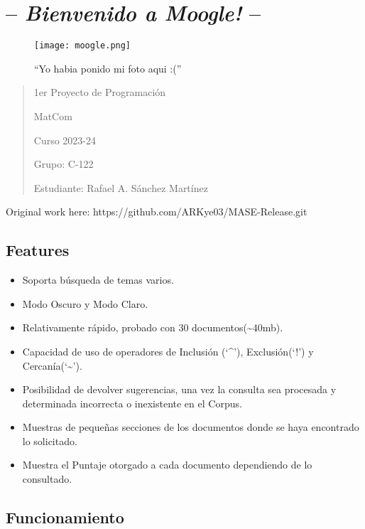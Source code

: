 \hypertarget{bienvenido-a-moogle}{%
\section{\texorpdfstring{-- \emph{Bienvenido a Moogle!}
--}{-- Bienvenido a Moogle! --}}\label{bienvenido-a-moogle}}

\begin{figure}
\centering
\texttt{[image: moogle.png]}
\caption{``Yo habia ponido mi foto aqui :(''}
\end{figure}

\begin{quote}
1er Proyecto de Programación

MatCom

Curso 2023-24

Grupo: C-122

Estudiante: Rafael A. Sánchez Martínez
\end{quote}

Original work here: https://github.com/ARKye03/MASE-Release.git

\hypertarget{features}{%
\subsection{Features}\label{features}}

\begin{itemize}
\tightlist
\item
  Soporta búsqueda de temas varios.
\item
  Modo Oscuro y Modo Claro.
\item
  Relativamente rápido, probado con 30 documentos(\textasciitilde40mb).
\item
  Capacidad de uso de operadores de Inclusión (`\^{}'), Exclusión(`!') y
  Cercanía(`\textasciitilde{}').
\item
  Posibilidad de devolver sugerencias, una vez la consulta sea procesada
  y determinada incorrecta o inexistente en el Corpus.
\item
  Muestras de pequeñas secciones de los documentos donde se haya
  encontrado lo solicitado.
\item
  Muestra el Puntaje otorgado a cada documento dependiendo de lo
  consultado.
\end{itemize}

\hypertarget{funcionamiento}{%
\subsection{Funcionamiento}\label{funcionamiento}}

